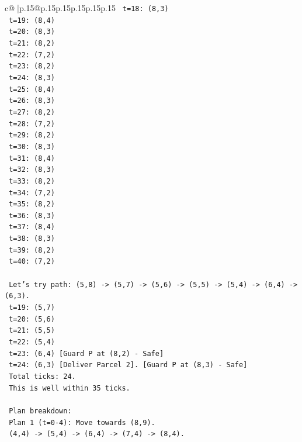 \documentclass{article}
\begin{document}
{\begin{supertabular}{c@{$\;$}|p{.15\linewidth}@{}p{.15\linewidth}p{.15\linewidth}p{.15\linewidth}p{.15\linewidth}p{.15\linewidth}}
{{{\texttt{   t=18: (8,3)} \\
\texttt{   t=19: (8,4)} \\
\texttt{   t=20: (8,3)} \\
\texttt{   t=21: (8,2)} \\
\texttt{   t=22: (7,2)} \\
\texttt{   t=23: (8,2)} \\
\texttt{   t=24: (8,3)} \\
\texttt{   t=25: (8,4)} \\
\texttt{   t=26: (8,3)} \\
\texttt{   t=27: (8,2)} \\
\texttt{   t=28: (7,2)} \\
\texttt{   t=29: (8,2)} \\
\texttt{   t=30: (8,3)} \\
\texttt{   t=31: (8,4)} \\
\texttt{   t=32: (8,3)} \\
\texttt{   t=33: (8,2)} \\
\texttt{   t=34: (7,2)} \\
\texttt{   t=35: (8,2)} \\
\texttt{   t=36: (8,3)} \\
\texttt{   t=37: (8,4)} \\
\texttt{   t=38: (8,3)} \\
\texttt{   t=39: (8,2)} \\
\texttt{   t=40: (7,2)} \\
\\ 
\texttt{   Let's try path: (5,8) {-}> (5,7) {-}> (5,6) {-}> (5,5) {-}> (5,4) {-}> (6,4) {-}> (6,3).} \\
\texttt{   t=19: (5,7)} \\
\texttt{   t=20: (5,6)} \\
\texttt{   t=21: (5,5)} \\
\texttt{   t=22: (5,4)} \\
\texttt{   t=23: (6,4) {[}Guard P at (8,2) {-} Safe{]}} \\
\texttt{   t=24: (6,3) {[}Deliver Parcel 2{]}. {[}Guard P at (8,3) {-} Safe{]}} \\
\texttt{   Total ticks: 24.} \\
\texttt{   This is well within 35 ticks.} \\
\\ 
\texttt{   Plan breakdown:} \\
\texttt{   Plan 1 (t=0{-}4): Move towards (8,9).} \\
\texttt{   (4,4) {-}> (5,4) {-}> (6,4) {-}> (7,4) {-}> (8,4).} \\
}}}
\end{supertabular}}
\end{document}
